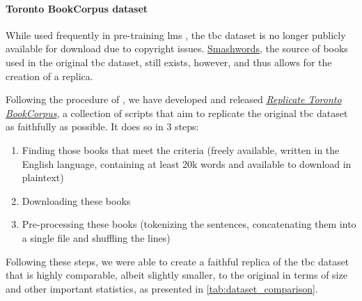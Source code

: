 \paragraph{Toronto BookCorpus dataset}
While used frequently in pre-training \glspl{lm} \citep{radford2018improving,devlin2018bert,yang2019xlnet}, the \gls{tbc} dataset \citep{zhu2015aligning} is no longer publicly available for download due to copyright issues. \href{https://www.smashwords.com/}{Smashwords}, the source of books used in the original \gls{tbc} dataset, still exists, however, and thus allows for the creation of a replica. 

Following the procedure of \citet{graaf2019replicating}, we have developed and released \href{https://github.com/sgraaf/Replicate-Toronto-BookCorpus}{\emph{Replicate Toronto BookCorpus}}, a collection of scripts that aim to replicate the original \gls{tbc} dataset \citep{zhu2015aligning} as faithfully as possible. It does so in 3 steps:
\begin{enumerate}
    \item Finding those books that meet the criteria (freely available, written in the English language, containing at least 20k words and available to download in plaintext)
    \item Downloading these books
    \item Pre-processing these books (tokenizing the sentences, concatenating them into a single file and shuffling the lines)
\end{enumerate}

Following these steps, we were able to create a faithful replica of the \gls{tbc} dataset that is highly comparable, albeit slightly smaller, to the original in terms of size and other important statistics, as presented in \cref{tab:dataset_comparison}.

